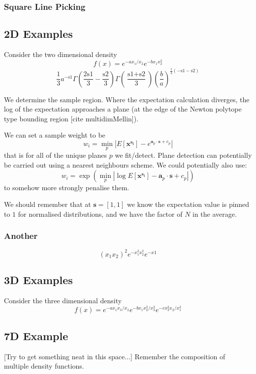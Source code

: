 \documentclass{article}
\begin{document}
\subsubsection{Square Line Picking}

\subsection{2D Examples}
Consider the two dimensional density
$$
f(x) = e^{-a x_1/x_2}e^{-b x_1 x_2^2}
$$
$$
 \frac{1}{3} a^{-\text{s1}} \Gamma \left(\frac{2 \text{s1}}{3}-\frac{\text{s2}}{3}\right) \Gamma \left(\frac{\text{s1}+\text{s2}}{3}\right) \left(\frac{b}{a}\right)^{\frac{1}{3}
    (-\text{s1}-\text{s2})}
$$

We determine the sample region. Where the expectation calculation diverges, the log of the expectation approaches a plane (at the edge of the Newton polytope type bounding region [cite multidimMellin]).

We can set a sample weight to be 
$$
w_i = \min_{p} |E[\mathbf{x^{s_i}}] - e^{\mathbf{a}_p \cdot \mathbf{s} + c_p}|
$$
that is for all of the unique planes $p$ we fit/detect. Plane detection can potentially be carried out using a nearest neighbours scheme. We could potentially also use:
$$
w_i = \exp\left(\min_{p} |\log E[\mathbf{x^{s_i}}] - \mathbf{a}_p \cdot \mathbf{s} + c_p| \right)
$$
to somehow more strongly penalise them.

We should remember that at $\mathbf{s} =[1,1]$ we know the expectation value is pinned to $1$ for normalised distributions, and we have the factor of $N$ in the average.




\subsubsection{Another}
$$
(x_1 x_2)^2 e^{-x_1^2x_2^2}e^{-x1}
$$


\subsection{3D Examples}
Consider the three dimensional density
$$
f(x) = e^{-a x_1 x_3/x_2}e^{-b x_1 x_2^2/x_3^2}e^{- c x_3^2 x_2/x_1^2}
$$

\subsection{7D Example}
[Try to get something neat in this space...]
Remember the composition of multiple density functions.
\end{document}

